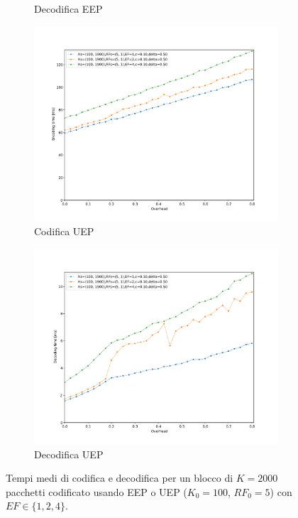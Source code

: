 \documentclass[italian, a4paper, 12pt]{article}
\begin{document}
\begin{figure}[htb]
\begin{subfigure}{0.5\textwidth}
    \caption{Decodifica EEP}
    \label{fig:dectime_eep}
  \end{subfigure}
  \begin{subfigure}{0.5\textwidth}
    \centering
    \includegraphics[width=\textwidth]{plot_enc_time_uep}
    \caption{Codifica UEP}
    \label{fig:enctime_uep}
  \end{subfigure}%
  \begin{subfigure}{0.5\textwidth}
    \centering
    \includegraphics[width=\textwidth]{plot_dec_time_uep}
    \caption{Decodifica UEP}
    \label{fig:dectime_uep}
  \end{subfigure}
  \caption{Tempi medi di codifica e decodifica per un blocco di
    $K=2000$ pacchetti codificato usando EEP o UEP ($K_0 = 100$,
    $RF_0=5$) con $EF \in \{1,2,4\}$.}
  \label{fig:encdec}
\end{figure}
\end{document}
